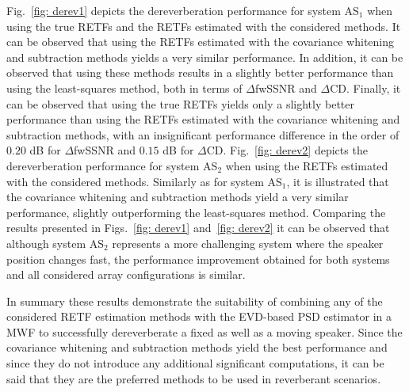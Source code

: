 \documentclass{article}
\begin{document}
Fig.~\ref{fig: derev1} depicts the dereverberation performance for system AS$_1$ when using the true RETFs and the RETFs estimated with the considered methods.
It can be observed that using the RETFs estimated with the covariance whitening and subtraction methods yields a very similar performance.
In addition, it can be observed that using these methods results in a slightly better performance than using the least-squares method, both in terms of $\Delta$fwSSNR and $\Delta$CD.
Finally, it can be observed that using the true RETFs yields only a slightly better performance than using the RETFs estimated with the covariance whitening and subtraction methods, with an insignificant performance difference in the order of $0.20$ dB for $\Delta$fwSSNR and $0.15$ dB for $\Delta$CD.
Fig.~\ref{fig: derev2} depicts the dereverberation performance for system AS$_2$ when using the RETFs estimated with the considered methods.
Similarly as for system AS$_1$, it is illustrated that the covariance whitening and subtraction methods yield a very similar performance, slightly outperforming the least-squares method.
Comparing the results presented in Figs.~\ref{fig: derev1} and~\ref{fig: derev2} it can be observed that although system AS$_2$ represents a more challenging system where the speaker position changes fast, the performance improvement obtained for both systems and all considered array configurations is similar.

In summary these results demonstrate the suitability of combining any of the considered RETF estimation methods with the EVD-based PSD estimator in a MWF to successfully dereverberate a fixed as well as a moving speaker.
Since the covariance whitening and subtraction methods yield the best performance and since they do not introduce any additional significant computations, it can be said that they are the preferred methods to be used in reverberant scenarios.

\vspace{-0.1cm}
\end{document}
